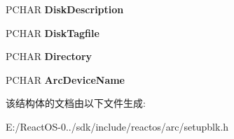 \begin{DoxyCompactItemize}
P\+C\+H\+AR {\bfseries Disk\+Description}
\item 
\mbox{\label{struct___d_e_t_e_c_t_e_d___d_e_v_i_c_e___f_i_l_e_afeafe4922f8f53ec459a47c88866164a}} 
P\+C\+H\+AR {\bfseries Disk\+Tagfile}
\item 
\mbox{\label{struct___d_e_t_e_c_t_e_d___d_e_v_i_c_e___f_i_l_e_a4dcd60fe77a1243007350e974025ddda}} 
P\+C\+H\+AR {\bfseries Directory}
\item 
\mbox{\label{struct___d_e_t_e_c_t_e_d___d_e_v_i_c_e___f_i_l_e_a413336a52057b818542e64e63932a283}} 
P\+C\+H\+AR {\bfseries Arc\+Device\+Name}
\end{DoxyCompactItemize}


该结构体的文档由以下文件生成\+:\begin{DoxyCompactItemize}
\item 
E\+:/\+React\+O\+S-\/0../sdk/include/reactos/arc/setupblk.\+h\end{DoxyCompactItemize}
